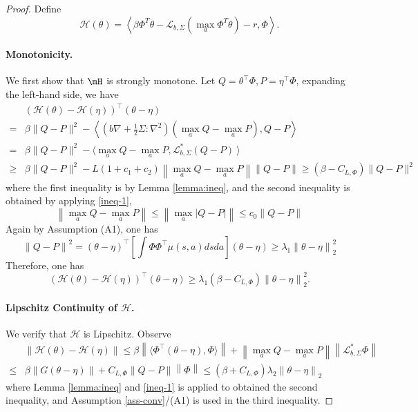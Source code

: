 \documentclass[12pt]{article}
\def\lam{\lambda}
\def\th{\theta}
\def\th{\theta}
\def\mL{\mathcal{L}_{b,\Sigma}}
\def\l{\left}
\def\r{\right}
\def\la{\left\langle}
\def\ra{\right\rangle}
\def\ll{\left\lVert}
\def\rl{\right\rVert}
\begin{document}
\begin{proof}
Define
\begin{equation}
        \mathcal{H}(\theta) = \left\langle \beta \Phi^T \theta - \mathcal{L}_{b,\Sigma}\l(  \max_a \Phi^T \theta\r) - r, \Phi \right\rangle.
\end{equation}   
\paragraph{Monotonicity.}
We first show that $\mH$ is strongly monotone. 
Let $Q = \th^\top\Phi, P = \eta^\top \Phi$, expanding the left-hand side, we have
\begin{align*}
&\l(\mathcal{H}(\theta) -  \mathcal{H}(\eta) \r)^\top (\theta - \eta)\\
= &\beta\|Q-P\|^2 - \la (b \nabla + \frac{1}{2} \Sigma: \nabla^2)(\max_a Q - \max_a P), Q-P \ra\\
=&\beta\|Q-P\|^2 - \langle \max_a Q - \max_a P, \mL^*(Q-P) \ \rangle \\
\geq&\beta \|Q-P\|^2 - L(1+c_1+c_2)\ll\max_a Q - \max_a P\rl \ll Q - P \rl  \geq (\beta - C_{L,\Phi})\|Q-P\|^2
\end{align*}
where the first inequality is by Lemma \ref{lemma:ineq}, and the second inequality is obtained by applying \eqref{ineq-1}, 
\[
\ll\max_a Q - \max_a P\rl \leq \ll \max_a |Q - P| \rl \leq c_0\ll Q - P \rl
\]
Again by Assumption (A1), one has
\[
\ll Q - P \rl^2 = (\th - \eta)^\top\l[\int\Phi\Phi^\top \mu(s,a)dsda\r](\th - \eta) \geq \lam_1\ll \th - \eta \rl_2^2 
\]
Therefore, one has
\[
\l(\mathcal{H}(\theta) -  \mathcal{H}(\eta) \r)^\top (\theta - \eta) \geq \lam_1(\beta - C_{L,\Phi})\ll \th - \eta\rl_2^2.
\]

\paragraph{Lipschitz Continuity of $ \mathcal{H} $.}
We verify that $ \mathcal{H} $ is Lipschitz. Observe
\begin{align*}
&\|\mathcal{H}(\theta) - \mathcal{H}(\eta)\| 
\leq \beta\ll \langle \Phi^\top (\theta-\eta), \Phi \rangle\rl + \ll  \max_aQ - \max_a P \rl \ll  \mL^*\Phi \rl\\
\leq & \beta \ll G(\th - \eta)  \rl + C_{L,\Phi}\ll Q - P \rl\ll \Phi\rl 
\leq(\beta+ C_{L,\Phi}) \lam_2  \ll \th - \eta \rl_2 
\end{align*}
where Lemma \ref{lemma:ineq} and \eqref{ineq-1} is applied to obtained the second inequality, and Assumption \ref{ass-conv}/(A1) is used in the third inequality. 


\end{proof}
\end{document}
